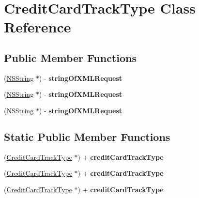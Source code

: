\hypertarget{interface_credit_card_track_type}{
\section{CreditCardTrackType Class Reference}
\label{interface_credit_card_track_type}
}
\subsection*{Public Member Functions}
\begin{DoxyCompactItemize}
\item 
\hypertarget{interface_credit_card_track_type_a1e41a9706074318bebccb32222174610}{
(\hyperlink{class_n_s_string}{NSString} $\ast$) -\/ {\bfseries stringOfXMLRequest}}
\label{interface_credit_card_track_type_a1e41a9706074318bebccb32222174610}

\item 
\hypertarget{interface_credit_card_track_type_a1e41a9706074318bebccb32222174610}{
(\hyperlink{class_n_s_string}{NSString} $\ast$) -\/ {\bfseries stringOfXMLRequest}}
\label{interface_credit_card_track_type_a1e41a9706074318bebccb32222174610}

\item 
\hypertarget{interface_credit_card_track_type_a1e41a9706074318bebccb32222174610}{
(\hyperlink{class_n_s_string}{NSString} $\ast$) -\/ {\bfseries stringOfXMLRequest}}
\label{interface_credit_card_track_type_a1e41a9706074318bebccb32222174610}

\end{DoxyCompactItemize}
\subsection*{Static Public Member Functions}
\begin{DoxyCompactItemize}
\item 
\hypertarget{interface_credit_card_track_type_a499fef821520a2eb3aed14a4d171d8af}{
(\hyperlink{interface_credit_card_track_type}{CreditCardTrackType} $\ast$) + {\bfseries creditCardTrackType}}
\label{interface_credit_card_track_type_a499fef821520a2eb3aed14a4d171d8af}

\item 
\hypertarget{interface_credit_card_track_type_a499fef821520a2eb3aed14a4d171d8af}{
(\hyperlink{interface_credit_card_track_type}{CreditCardTrackType} $\ast$) + {\bfseries creditCardTrackType}}
\label{interface_credit_card_track_type_a499fef821520a2eb3aed14a4d171d8af}

\item 
\hypertarget{interface_credit_card_track_type_a499fef821520a2eb3aed14a4d171d8af}{
(\hyperlink{interface_credit_card_track_type}{CreditCardTrackType} $\ast$) + {\bfseries creditCardTrackType}}
\label{interface_credit_card_track_type_a499fef821520a2eb3aed14a4d171d8af}

\end{DoxyCompactItemize}
